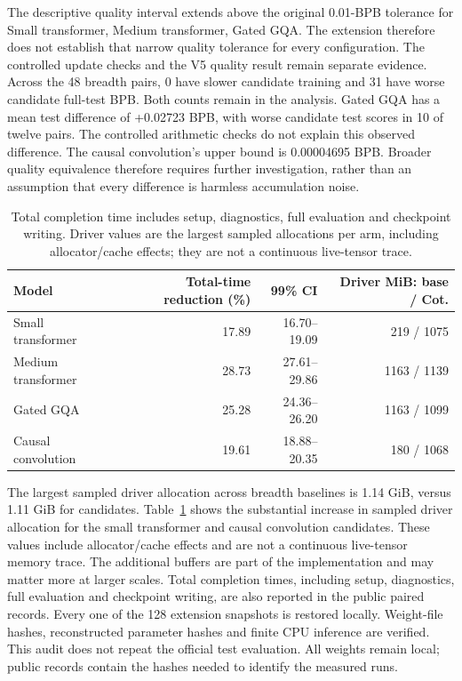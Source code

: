 \documentclass[11pt]{article}
\begin{document}
The descriptive quality interval extends above the original 0.01-BPB tolerance for Small transformer, Medium transformer, Gated GQA. The extension therefore does not establish that narrow quality tolerance for every configuration. The controlled update checks and the V5 quality result remain separate evidence. Across the 48 breadth pairs, 0 have slower candidate training and 31 have worse candidate full-test BPB. Both counts remain in the analysis. Gated GQA has a mean test difference of +0.02723 BPB, with worse candidate test scores in 10 of twelve pairs. The controlled arithmetic checks do not explain this observed difference. The causal convolution's upper bound is 0.00004695 BPB. Broader quality equivalence therefore requires further investigation, rather than an assumption that every difference is harmless accumulation noise.
\begin{table}[H]
\centering
\small
\begin{tabular}{@{}lrrr@{}}
\toprule
Model & Total-time reduction (\%) & 99\% CI & Driver MiB: base / Cot.\\
\midrule
Small transformer & 17.89 & 16.70--19.09 & 219 / 1075 \\
Medium transformer & 28.73 & 27.61--29.86 & 1163 / 1139 \\
Gated GQA & 25.28 & 24.36--26.20 & 1163 / 1099 \\
Causal convolution & 19.61 & 18.88--20.35 & 180 / 1068 \\
\bottomrule
\end{tabular}
\caption{Total completion time includes setup, diagnostics, full evaluation and
checkpoint writing. Driver values are the largest sampled allocations per arm,
including allocator/cache effects; they are not a continuous live-tensor trace.}
\label{tab:cost}
\end{table}
The largest sampled driver allocation across breadth baselines is 1.14 GiB, versus 1.11 GiB for candidates. Table~\ref{tab:cost} shows the substantial increase in sampled driver allocation for the small transformer and causal convolution candidates. These values include allocator/cache effects and are not a continuous live-tensor memory trace. The additional buffers are part of the implementation and may matter more at larger scales. Total completion times, including setup, diagnostics, full evaluation and checkpoint writing, are also reported in the public paired records.
Every one of the 128 extension snapshots is restored locally. Weight-file
hashes, reconstructed parameter hashes and finite CPU inference are verified.
This audit does not repeat the official test evaluation. All weights remain
local; public records contain the hashes needed to identify the measured runs.
\end{document}
